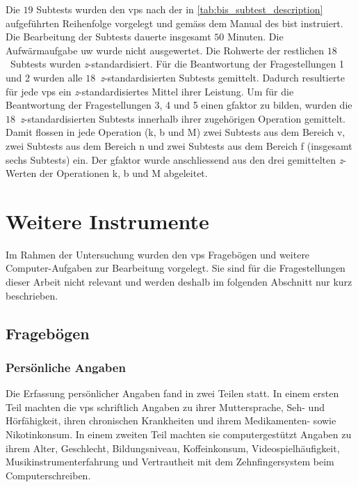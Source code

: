 \documentclass[11pt, twoside, a4paper]{book}		%
\begin{document}
Die $19$ Subtests wurden den \glspl{vp} nach der in \autoref{tab:bis_subtest_description} aufgeführten Reihenfolge vorgelegt und gemäss dem Manual des \gls{bist} instruiert. 
Die Bearbeitung der Subtests dauerte insgesamt $50$ Minuten.
Die Aufwärmaufgabe \gls{uw} wurde nicht ausgewertet. Die Rohwerte der restlichen $18$~Subtests wurden \textit{z}-standardisiert. 
Für die Beantwortung der Fragestellungen 1 und 2 wurden alle $18$~\textit{z}-stand\-ard\-isier\-ten Subtests gemittelt. Dadurch resultierte für jede \glspl{vp} ein \textit{z}-standardisiertes Mittel ihrer Leistung. 
Um für die Beantwortung der Fragestellungen 3, 4 und 5 einen \gls{gfaktor} zu bilden, wurden die $18$~\textit{z}-standardisierten Subtests innerhalb ihrer zugehörigen Operation gemittelt. Damit flossen in jede Operation (\gls{k}, \gls{b} und \gls{M}) zwei Subtests aus dem Bereich \gls{v}, zwei Subtests aus dem Bereich \gls{n} und zwei Subtests aus dem Bereich \gls{f} (insgesamt sechs Subtests) ein. Der \gls{gfaktor} wurde anschliessend aus den drei gemittelten \textit{z}-Werten der Operationen \gls{k}, \gls{b} und \gls{M} abgeleitet.


\section{Weitere Instrumente}

Im Rahmen der Untersuchung wurden den \glspl{vp} Fragebögen und weitere Com\-put\-er-Auf\-gaben zur Bearbeitung vorgelegt. Sie sind für die Fragestellungen dieser Arbeit nicht relevant und werden deshalb im folgenden Abschnitt nur kurz beschrieben.


\subsection{Fragebögen}

\subsubsection*{Persönliche Angaben}
Die Erfassung persönlicher Angaben fand in zwei Teilen statt. In einem ersten Teil machten die \glspl{vp} schriftlich Angaben zu ihrer Muttersprache, Seh- und Hörfähigkeit, ihren chronischen Krankheiten und ihrem Medikamenten- sowie Nikotinkonsum. In einem zweiten Teil machten sie computergestützt Angaben zu ihrem Alter, Geschlecht, Bildungsniveau, Koffeinkonsum,  Videospielhäufigkeit, Musikinstrumenterfahrung und Vertrautheit mit dem Zehnfingersystem beim Computerschreiben.
\end{document}
